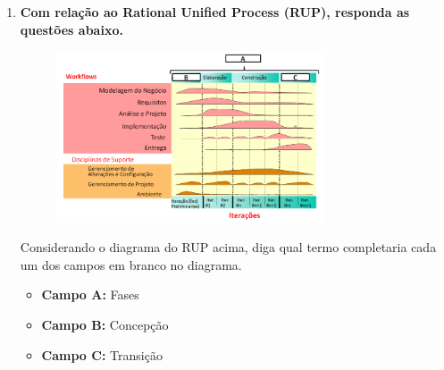 \documentclass[12pt, a4paper]{article}
\newcommand{\tb}[1]{\textbf{#1}}
\newcommand{\question}[1]{\item \tb{#1}}
\begin{document}
\begin{enumerate}[label=\textbf{\arabic*.}]
        \newpage
        \question{Com relação ao Rational Unified Process (RUP), responda as questões abaixo.}
        \begin{figure}[!ht]
            \centering
            \includegraphics[width=0.75\textwidth,keepaspectratio]{rup}
            \label{fig:my_label}
        \end{figure}
        \par Considerando o diagrama do RUP acima, diga qual termo completaria cada um dos campos em branco no diagrama.
        \\
        \begin{itemize}
            \item \tb{Campo A:} Fases
            \item \tb{Campo B:} Concepção
            \item \tb{Campo C:} Transição
        \end{itemize}
    \end{enumerate}



    
\end{document}
